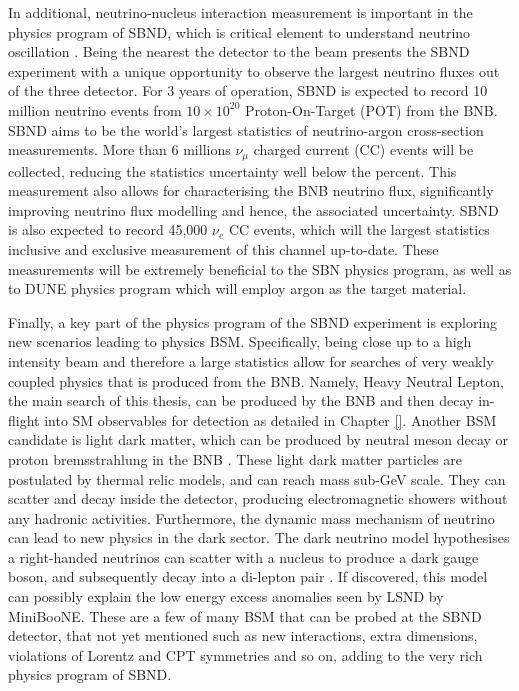 In additional, neutrino-nucleus interaction measurement is important in the physics program of SBND, which is critical element to understand neutrino oscillation \cite{}.
Being the nearest the detector to the beam presents the SBND experiment with a unique opportunity to observe the largest neutrino fluxes out of the three detector.
For 3 years of operation, SBND is expected to record 10 million neutrino events from $10 \times 10^{20}$ Proton-On-Target (POT) from the BNB.
SBND aims to be the world's largest statistics of neutrino-argon cross-section measurements.
More than 6 millions $\nu_{\mu}$ charged current (CC) events will be collected, reducing the statistics uncertainty well below the percent.
This measurement also allows for characterising the BNB neutrino flux, significantly improving neutrino flux modelling and hence, the associated uncertainty.
SBND is also expected to record 45,000 $\nu_{e}$ CC events, which will the largest statistics inclusive and exclusive measurement of this channel up-to-date.
These measurements will be extremely beneficial to the SBN physics program, as well as to DUNE physics program which will employ argon as the target material.

Finally, a key part of the physics program of the SBND experiment is exploring new scenarios leading to physics BSM.
Specifically, being close up to a high intensity beam and therefore a large statistics allow for searches of very weakly coupled physics that is produced from the BNB. 
Namely, Heavy Neutral Lepton, the main search of this thesis, can be produced by the BNB and then decay in-flight into SM observables for detection as detailed in Chapter \ref{}.
Another BSM candidate is light dark matter, which can be produced by neutral meson decay or proton bremsstrahlung in the BNB \cite{}.
These light dark matter particles are postulated by thermal relic models, and can reach mass sub-GeV scale.
They can scatter and decay inside the detector, producing electromagnetic showers without any hadronic activities.
Furthermore, the dynamic mass mechanism of neutrino can lead to new physics in the dark sector. 
The dark neutrino model hypothesises a right-handed neutrinos can scatter with a nucleus to produce a dark gauge boson, and subsequently decay into a di-lepton pair \cite{}.
If discovered, this model can possibly explain the low energy excess anomalies seen by LSND by MiniBooNE.
These are a few of many BSM that can be probed at the SBND detector, that not yet mentioned such as new interactions, extra dimensions, violations of Lorentz and CPT symmetries and so on, adding to the very rich physics program of SBND.

